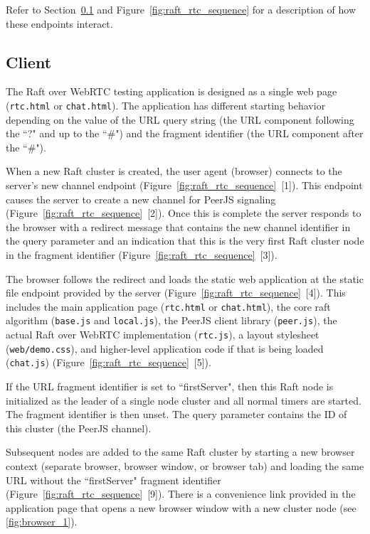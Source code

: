 \documentclass[9pt]{extarticle}
\begin{document}
\begin{multicols}{2}
\begin{enumerate}
\end{enumerate}

Refer to Section~\ref{section:design-client} and
Figure~\ref{fig:raft_rtc_sequence} for a description of how these
endpoints interact.

\subsection{Client}
    \label{section:design-client}

The Raft over WebRTC testing application is designed as a single web
page (\texttt{rtc.html} or \texttt{chat.html}). The application has
different starting behavior depending on the value of the URL query
string (the URL component following the ``?" and up to the ``\#") and
the fragment identifier (the URL component after the ``\#").

When a new Raft cluster is created, the user agent (browser) connects
to the server's new channel endpoint
(Figure~\ref{fig:raft_rtc_sequence}~[1]). This endpoint causes the
server to create a new channel for PeerJS signaling
(Figure~\ref{fig:raft_rtc_sequence}~[2]). Once this is complete the
server responds to the browser with a redirect message
that contains the new channel identifier in the query parameter and an
indication that this is the very first Raft cluster node in the
fragment identifier (Figure~\ref{fig:raft_rtc_sequence}~[3]).

The browser follows the redirect and loads the static web application
at the static file endpoint provided by the server
(Figure~\ref{fig:raft_rtc_sequence}~[4]). This includes the
main application page (\texttt{rtc.html} or \texttt{chat.html}), the
core raft algorithm (\texttt{base.js} and \texttt{local.js}), the
PeerJS client library (\texttt{peer.js}), the actual Raft over WebRTC
implementation (\texttt{rtc.js}), a layout stylesheet
(\texttt{web/demo.css}), and higher-level application code if that is
being loaded (\texttt{chat.js})
(Figure~\ref{fig:raft_rtc_sequence}~[5]).

If the URL fragment identifier is set to ``firstServer", then this Raft
node is initialized as the leader of a single node cluster and all
normal timers are started. The fragment identifier is then unset. The
query parameter contains the ID of this cluster (the PeerJS channel).

Subsequent nodes are added to the same Raft cluster by starting a new
browser context (separate browser, browser window, or browser tab) and
loading the same URL without the ``firstServer" fragment identifier
(Figure~\ref{fig:raft_rtc_sequence}~[9]). There is a convenience link
provided in the application page that opens a new browser window with
a new cluster node (see \ref{fig:browser_1}).


\end{multicols}
\end{document}
